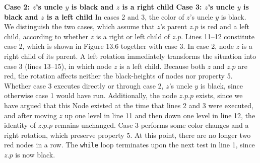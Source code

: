\documentclass{report}
\begin{document}
\bigbreak \noindent 
\textbf{Case 2: $z$'s uncle $y$ is black and $z$ is a right child}
\bigbreak \noindent 
\textbf{Case 3: $z$'s uncle $y$ is black and $z$ is a left child}
\bigbreak \noindent 
In cases 2 and 3, the color of $z$’s uncle $y$ is black. We distinguish the two cases, which assume that $z$’s parent $z.p$ is red and a left child, according to whether $z$ is a right or left child of $z.p$. Lines 11–12 constitute case 2, which is shown in Figure 13.6 together with case 3. In case 2, node $z$ is a right child of its parent. A left rotation immediately transforms the situation into case 3 (lines 13–15), in which node $z$ is a left child. Because both $z$ and $z.p$ are red, the rotation affects neither the black-heights of nodes nor property 5. Whether case 3 executes directly or through case 2, $z$’s uncle $y$ is black, since otherwise case 1 would have run. Additionally, the node $z.p.p$ exists, since we have argued that this Node existed at the time that lines 2 and 3 were executed, and after moving $z$ up one level in line 11 and then down one level in line 12, the identity of $z.p.p$ remains unchanged. Case 3 performs some color changes and a right rotation, which preserve property 5. At this point, there are no longer two red nodes in a row. The \texttt{while} loop terminates upon the next test in line 1, since $z.p$ is now black.
\bigbreak \noindent 
{}

\pagebreak 
\end{document}
